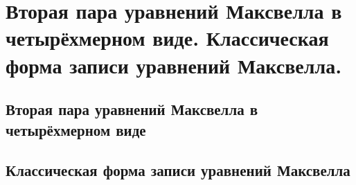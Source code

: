 \chapter{Вторая пара уравнений Максвелла в четырёхмерном виде. 
Классическая форма записи уравнений Максвелла.}

\section{Вторая пара уравнений Максвелла в четырёхмерном виде}
\section{Классическая форма записи уравнений Максвелла}
